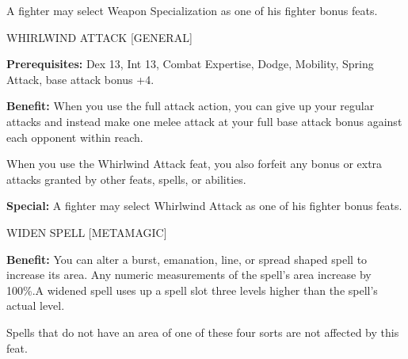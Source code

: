 \documentclass{article}
\begin{document}
A fighter may select Weapon Specialization as one of his fighter bonus feats.

\vspace{12pt}
WHIRLWIND ATTACK [GENERAL]

\textbf{Prerequisites:} Dex 13, Int 13, Combat Expertise, Dodge, Mobility, Spring 
Attack, base attack bonus +4.

\textbf{Benefit:} When you use the full attack action, you can give up your regular 
attacks and instead make one melee attack at your full base attack bonus against 
each opponent within reach.

When you use the Whirlwind Attack feat, you also forfeit any bonus or extra attacks 
granted by other feats, spells, or abilities.

\textbf{Special:} A fighter may select Whirlwind Attack as one of his fighter bonus 
feats.

\vspace{12pt}
WIDEN SPELL [METAMAGIC]

\textbf{Benefit:} You can alter a burst, emanation, line, or spread shaped spell 
to increase its area. Any numeric measurements of the spell's area increase by 
100\%.A widened spell uses up a spell slot three levels higher than the spell's 
actual level.

Spells that do not have an area of one of these four sorts are not affected by 
this feat.

\newpage
\end{document}

